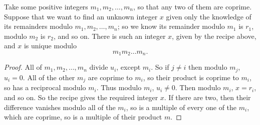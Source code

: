 \begin{theorem}
Take some positive integers \(m_1, m_2, \dots, m_n\), so that any two of them are coprime.
Suppose that we want to find an unknown integer \(x\) given only the knowledge of its remainders modulo \(m_1, m_2, \dots, m_n\); so we know its remainder modulo \(m_1\) is \(r_1\), modulo \(m_2\) is \(r_2\), and so on.
There is such an integer \(x\), given by the recipe above, and \(x\) is unique modulo 
\[
m_1 m_2 \dots m_n.
\]
\end{theorem}
\begin{proof}
All of \(m_1, m_2, \dots, m_n\) divide \(u_i\), except \(m_i\).
So if \(j \ne i\) then modulo \(m_j\), \(u_i=0\).
All of the other \(m_j\) are coprime to \(m_i\), so their product is coprime to \(m_i\), so has a reciprocal modulo \(m_i\).
Thus modulo \(m_i\), \(u_i\ne 0\). 
Then modulo \(m_i\), \(x=r_i\), and so on.
So the recipe gives the required integer \(x\).
If there are two, then their difference vanishes modulo all of the \(m_i\), so is a multiple of every one of the \(m_i\), which are coprime, so is a multiple of their product \(m\).
\end{proof}


